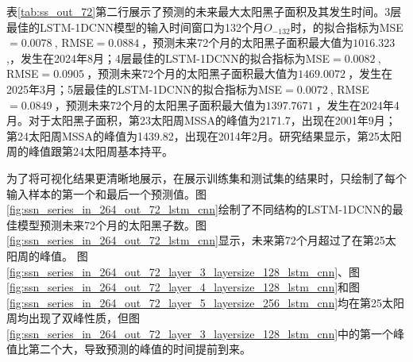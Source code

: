 表\ref{tab:ss_out_72}第二行展示了预测的未来最大太阳黑子面积及其发生时间。3层最佳的LSTM-1DCNN模型的输入时间窗口为132个月$O_{-132}$时，的拟合指标为MSE$=\SI{0.0078}{}$, RMSE$=\SI{0.0884}{}$，预测未来72个月的太阳黑子面积最大值为$\SI{1016.323}{}$,，发生在2024年8月；4层最佳的LSTM-1DCNN的拟合指标为MSE$=\SI{0.0082}{}$, RMSE$=\SI{0.0905}{}$，预测未来72个月的太阳黑子面积最大值为$\SI{1469.0072}{}$，发生在2025年3月；5层最佳的LSTM-1DCNN的拟合指标为MSE$=\SI{0.0072}{}$, RMSE$=\SI{0.0849}{}$，预测未来72个月的太阳黑子面积最大值为$\SI{1397.7671}{}$，发生在2024年4月。对于太阳黑子面积，第23太阳周MSSA的峰值为2171.7，出现在2001年9月；第24太阳周MSSA的峰值为1439.82，出现在2014年2月。研究结果显示，第25太阳周的峰值跟第24太阳周基本持平。 

为了将可视化结果更清晰地展示，在展示训练集和测试集的结果时，只绘制了每个输入样本的第一个和最后一个预测值。图\ref{fig:ssn_series_in_264_out_72_lstm_cnn}绘制了不同结构的LSTM-1DCNN的最佳模型预测未来72个月的太阳黑子数。图\ref{fig:ssn_series_in_264_out_72_lstm_cnn}显示，未来第72个月超过了在第25太阳周的峰值。
图\ref{fig:ssn_series_in_264_out_72_layer_3_layersize_128_lstm_cnn}、图\ref{fig:ssn_series_in_264_out_72_layer_4_layersize_128_lstm_cnn}和图\ref{fig:ssn_series_in_264_out_72_layer_5_layersize_256_lstm_cnn}均在第25太阳周均出现了双峰性质，但图\ref{fig:ssn_series_in_264_out_72_layer_3_layersize_128_lstm_cnn}中的第一个峰值比第二个大，导致预测的峰值的时间提前到来。

